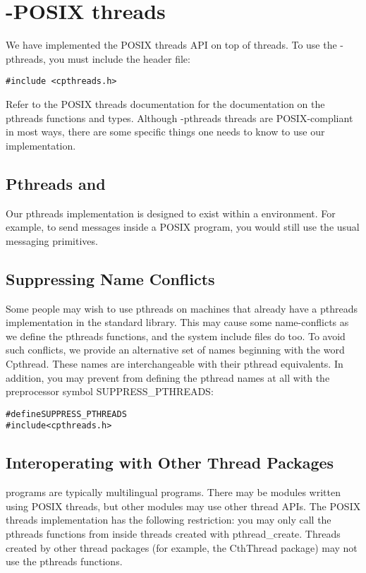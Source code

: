 \chapter{\converse{}-POSIX threads}

We have implemented the POSIX threads API on top of \converse{} threads.
To use the \converse{}-pthreads, you must include the header file:

\verb/#include <cpthreads.h>/

Refer to the POSIX threads documentation for the documentation on the
pthreads functions and types.  Although \converse{}-pthreads threads are
POSIX-compliant in most ways, there are some specific things one needs
to know to use our implementation.

\section{Pthreads and \converse{}}

Our pthreads implementation is designed to exist within a \converse{}
environment.  For example, to send messages inside a POSIX program,
you would still use the usual \converse{} messaging primitives.

\section{Suppressing Name Conflicts}

Some people may wish to use \converse{} pthreads on machines that already
have a pthreads implementation in the standard library.  This may
cause some name-conflicts as we define the pthreads functions, and the
system include files do too.  To avoid such conflicts, we provide an
alternative set of names beginning with the word Cpthread.  These
names are interchangeable with their pthread equivalents.  In addition,
you may prevent \converse{} from defining the pthread names at all with
the preprocessor symbol SUPPRESS\_PTHREADS:

\begin{alltt}
#define SUPPRESS_PTHREADS
#include <cpthreads.h>
\end{alltt}

\section{Interoperating with Other Thread Packages}

\converse{} programs are typically multilingual programs.  There may be
modules written using POSIX threads, but other modules may use other
thread APIs.  The POSIX threads implementation has the following
restriction: you may only call the pthreads functions from inside
threads created with pthread\_create.  Threads created by other thread
packages (for example, the CthThread package) may not use the pthreads
functions.

